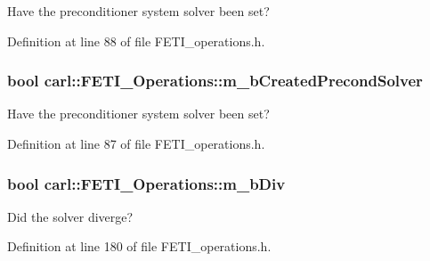 Have the preconditioner system solver been set? 



Definition at line 88 of file F\+E\+T\+I\+\_\+operations.\+h.

\hypertarget{classcarl_1_1_f_e_t_i___operations_a13dd551fd49ca08e4595c7829ccc90b8}{}
\subsubsection[{m\+\_\+b\+Created\+Precond\+Solver}]{\setlength{\rightskip}{0pt plus 5cm}bool carl\+::\+F\+E\+T\+I\+\_\+\+Operations\+::m\+\_\+b\+Created\+Precond\+Solver\hspace{0.3cm}{\ttfamily [protected]}}\label{classcarl_1_1_f_e_t_i___operations_a13dd551fd49ca08e4595c7829ccc90b8}


Have the preconditioner system solver been set? 



Definition at line 87 of file F\+E\+T\+I\+\_\+operations.\+h.

\hypertarget{classcarl_1_1_f_e_t_i___operations_a8f5c0b81912f20a3e5768b0da392e039}{}
\subsubsection[{m\+\_\+b\+Div}]{\setlength{\rightskip}{0pt plus 5cm}bool carl\+::\+F\+E\+T\+I\+\_\+\+Operations\+::m\+\_\+b\+Div\hspace{0.3cm}{\ttfamily [protected]}}\label{classcarl_1_1_f_e_t_i___operations_a8f5c0b81912f20a3e5768b0da392e039}


Did the solver diverge? 



Definition at line 180 of file F\+E\+T\+I\+\_\+operations.\+h.

\hypertarget{classcarl_1_1_f_e_t_i___operations_a7b94d72a58cd40af15151c28147ceb96}{}
